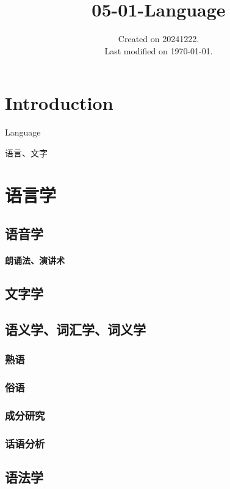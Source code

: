 \documentclass[UTF8]{../../RepresentationUniverse}
\begin{document}
\title{05-01-Language}
\date{Created on 20241222.\\   Last modified on \today.}
\maketitle
\tableofcontents

 



\chapter{Introduction}




Language


语言、文字




\chapter{语言学}
\section{语音学}
    \subsubsection{朗诵法、演讲术}
\section{文字学}
\section{语义学、词汇学、词义学}
    \subsection{熟语}
    \subsection{俗语}
    \subsection{成分研究}
    \subsection{话语分析}
\section{语法学}
\end{document}
